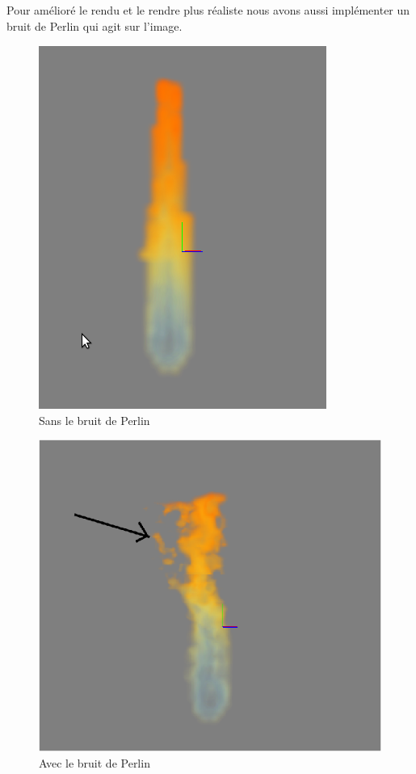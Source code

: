 \documentclass{beamer}
\begin{document}
\begin{frame}
  Pour amélioré le rendu et le rendre plus réaliste nous avons aussi
  implémenter un bruit de Perlin qui agit sur l'image.
  \begin{minipage}{0.48\linewidth} 
    \begin{figure}[!h]
      \centering\includegraphics[scale=0.3]{SansPerlin.png}
      \caption{Sans le bruit de Perlin}
      \label{SansPerlin}
    \end{figure}
  \end{minipage}
  \begin{minipage}{0.48\linewidth}
    \begin{figure}[!h]
      \centering\includegraphics[scale=0.2]{Perlin1.png}
      \caption{Avec le bruit de Perlin}
      \label{AvecPerlin}
    \end{figure}
  \end{minipage}
\end{frame}
\end{document}
